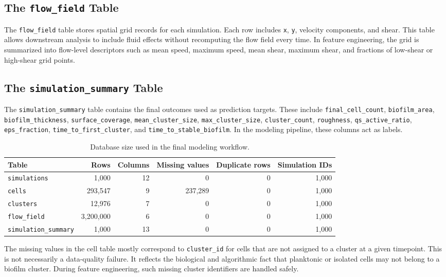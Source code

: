 \documentclass[12pt,a4paper,oneside]{report}
\begin{document}
\subsection{The \texttt{flow\_field} Table}
The \texttt{flow\_field} table stores spatial grid records for each simulation. Each row includes \texttt{x}, \texttt{y}, velocity components, and shear. This table allows downstream analysis to include fluid effects without recomputing the flow field every time. In feature engineering, the grid is summarized into flow-level descriptors such as mean speed, maximum speed, mean shear, maximum shear, and fractions of low-shear or high-shear grid points.

\subsection{The \texttt{simulation\_summary} Table}
The \texttt{simulation\_summary} table contains the final outcomes used as prediction targets. These include \texttt{final\_cell\_count}, \texttt{biofilm\_area}, \texttt{biofilm\_thickness}, \texttt{surface\_coverage}, \texttt{mean\_cluster\_size}, \texttt{max\_cluster\_size}, \texttt{cluster\_count}, \texttt{roughness}, \texttt{qs\_active\_ratio}, \texttt{eps\_fraction}, \texttt{time\_to\_first\_cluster}, and \texttt{time\_to\_stable\_biofilm}. In the modeling pipeline, these columns act as labels.

\begin{table}[H]
\centering
\caption{Database size used in the final modeling workflow.}
\label{tab:database-size}
\begin{tabular}{lrrrrr}
\toprule
Table & Rows & Columns & Missing values & Duplicate rows & Simulation IDs\\
\midrule
\texttt{simulations} & 1,000 & 12 & 0 & 0 & 1,000\\
\texttt{cells} & 293,547 & 9 & 237,289 & 0 & 1,000\\
\texttt{clusters} & 12,976 & 7 & 0 & 0 & 1,000\\
\texttt{flow\_field} & 3,200,000 & 6 & 0 & 0 & 1,000\\
\texttt{simulation\_summary} & 1,000 & 13 & 0 & 0 & 1,000\\
\bottomrule
\end{tabular}
\end{table}

The missing values in the cell table mostly correspond to \texttt{cluster\_id} for cells that are not assigned to a cluster at a given timepoint. This is not necessarily a data-quality failure. It reflects the biological and algorithmic fact that planktonic or isolated cells may not belong to a biofilm cluster. During feature engineering, such missing cluster identifiers are handled safely.
\end{document}

